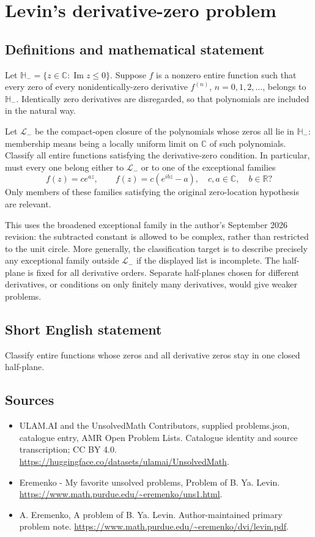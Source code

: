 \documentclass[11pt,a4paper]{article}
\begin{document}
\section*{Levin's derivative-zero problem}\label{statement}

\subsection{Definitions and mathematical statement}
Let $\mathbb H_-=\{z\in\mathbb C:\operatorname{Im}z\leq0\}$.
Suppose $f$ is a nonzero entire function such that every
zero of every nonidentically-zero derivative $f^{(n)}$,
$n=0,1,2,\ldots$, belongs to $\mathbb H_-$.
Identically zero derivatives are disregarded, so that
polynomials are included in the natural way.

Let $\mathcal L_-$ be the compact-open closure of the
polynomials whose zeros all lie in $\mathbb H_-$: membership
means being a locally uniform limit on $\mathbb C$ of
such polynomials. Classify all entire functions satisfying
the derivative-zero condition. In particular, must every
one belong either to $\mathcal L_-$ or to one of the
exceptional families
\[
             f(z)=c e^{az},\qquad
             f(z)=c(e^{ibz}-a),
 \quad c,a\in\mathbb C,\quad b\in\mathbb R?
\]
Only members of these families satisfying the original
zero-location hypothesis are relevant.

This uses the broadened exceptional family in the author's
September 2026 revision: the subtracted constant is allowed
to be complex, rather than restricted to the unit circle.
More generally, the classification target is to describe
precisely any exceptional family outside $\mathcal L_-$
if the displayed list is incomplete.
The half-plane is fixed for all derivative orders. Separate
half-planes chosen for different derivatives, or conditions
on only finitely many derivatives, would give weaker
problems.
\subsection{Short English statement}
Classify entire functions whose zeros and all derivative zeros stay in one closed half-plane.
\subsection{Sources}
\begin{itemize}
\item[S1] ULAM.AI and the UnsolvedMath Contributors, supplied problems.json, catalogue entry, AMR Open Problem Lists. Catalogue identity and source transcription; CC BY 4.0.
\url{https://huggingface.co/datasets/ulamai/UnsolvedMath}.
\item[S2] Eremenko - My favorite unsolved problems, Problem of B. Ya. Levin. 
\url{https://www.math.purdue.edu/~eremenko/uns1.html}.
\item[S3] A. Eremenko, A problem of B. Ya. Levin. Author-maintained primary problem note.
\url{https://www.math.purdue.edu/~eremenko/dvi/levin.pdf}.
\end{itemize}
\end{document}
